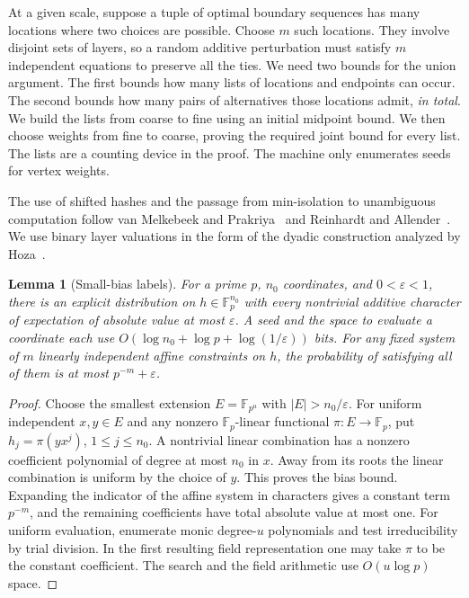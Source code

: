 \documentclass[11pt]{article}
\newtheorem{lemma}[theorem]{Lemma}
\newcommand{\F}{\mathbb F}
\begin{document}
At a given scale, suppose a tuple of optimal boundary sequences has many
locations where two choices are possible. Choose $m$ such locations.
They involve disjoint sets of layers, so a random additive perturbation
must satisfy $m$ independent equations to preserve all the ties.
We need two bounds for the union argument. The first bounds how many
lists of locations and endpoints can occur. The second bounds how many
pairs of alternatives those locations admit, \emph{in total}. We build
the lists from coarse to fine using an initial midpoint bound. We then
choose weights from fine to coarse, proving the required joint bound
for every list. The lists are a counting device in the proof. The
machine only enumerates seeds for vertex weights.

The use of shifted hashes and the passage from min-isolation to unambiguous
computation follow van Melkebeek and Prakriya~\cite{vMP} and Reinhardt and
Allender~\cite{RA}. We use binary layer valuations in the form of the
dyadic construction analyzed by Hoza~\cite[Appendix A]{Hoza}.

\begin{lemma}[Small-bias labels]\label{lem:bias}
For a prime $p$, $n_0$ coordinates, and $0<\varepsilon<1$, there is an explicit
distribution on $h\in\F_p^{n_0}$ with every nontrivial additive character
of expectation of absolute value at most $\varepsilon$. A seed and the
space to evaluate a coordinate each use $O(\log n_0+\log p+\log(1/\varepsilon))$
bits. For any fixed system of $m$ linearly independent affine constraints
on $h$, the probability of satisfying all of them is at most
$p^{-m}+\varepsilon$.
\end{lemma}
\begin{proof}
Choose the smallest extension $E=\F_{p^u}$ with $|E|>n_0/\varepsilon$.
For uniform independent $x,y\in E$ and any nonzero
$\F_p$-linear functional $\pi:E\to\F_p$, put $h_j=\pi(yx^j)$, $1\le j\le n_0$.
A nontrivial linear combination has a nonzero coefficient polynomial
of degree at most $n_0$ in $x$. Away from its roots the linear combination
is uniform by the choice of $y$. This proves the bias bound.
Expanding the indicator of the affine system in characters gives a constant term
$p^{-m}$, and the remaining coefficients have total absolute value at most one.
For uniform evaluation, enumerate monic degree-$u$ polynomials and test
irreducibility by trial division. In the first resulting field representation
one may take $\pi$ to be the constant coefficient. The search and the field
arithmetic use $O(u\log p)$ space.
\end{proof}
\end{document}
